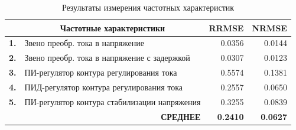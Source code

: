 \begin{table}[htbp]
    \caption{Результаты измерения частотных характеристик}
    \label{tbl:experiment_FR}
    \begin{threeparttable}
        \begin{tabular}{|l|l|l|l|}
            \hline
            & \multicolumn{1}{c|}{\textbf{Частотные характеристики}} & \multicolumn{1}{c|}{\textbf{RRMSE}} & \multicolumn{1}{c|}{\textbf{NRMSE}} \\ \hline
            \textbf{1.} & Звено преобр. тока в напряжение & \multicolumn{1}{r|}{\num{0.0356}} & \multicolumn{1}{r|}{\num{0.0144}}\\ \hline
            \textbf{2.} & Звено преобр. тока в напряжение с задержкой & \multicolumn{1}{r|}{\num{0.0307}} & \multicolumn{1}{r|}{\num{0.0123}}\\ \hline
            \textbf{3.} & ПИ-регулятор контура регулирования тока & \multicolumn{1}{r|}{\num{0.5574}} & \multicolumn{1}{r|}{\num{0.1381}}\\ \hline
			\textbf{4.} & ПИД-регулятор контура регулирования тока & \multicolumn{1}{r|}{\num{0.2557}} & \multicolumn{1}{r|}{\num{0.0650}}\\ \hline
			\textbf{5.} & ПИ-регулятор контура стабилизации напряжения & \multicolumn{1}{r|}{\num{0.3255}} & \multicolumn{1}{r|}{\num{0.0839}}\\ \hline
			& \multicolumn{1}{r|}{\textbf{СРЕДНЕЕ}} & \multicolumn{1}{r|}{\textbf{\num{0.2410}}} & \multicolumn{1}{r|}{\textbf{\num{0.0627}}}\\ \hline
        \end{tabular}
    \end{threeparttable}
\end{table}